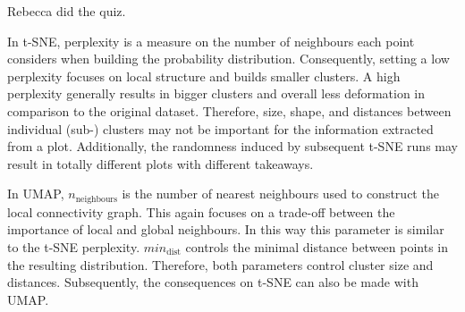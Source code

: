
\renewcommand{\ex}{8}
\setcounter{section}{\ex}


    \maketitle
    
    \begin{exercise}[Quiz] Rebecca did the quiz.
    \end{exercise}

    \begin{exercise}
    In t-SNE, perplexity is a measure on the number of neighbours each point considers when building the probability distribution.
    Consequently, setting a low perplexity focuses on local structure and builds smaller clusters.
    A high perplexity generally results in bigger clusters and overall less deformation in comparison to the original dataset.
    Therefore, size, shape, and distances between individual (sub-) clusters may not be important for the information extracted from a plot.
    Additionally, the randomness induced by subsequent t-SNE runs may result in totally different plots with different takeaways.

    In UMAP, \(n_\text{neighbours}\) is the number of nearest neighbours used to construct the local connectivity graph.
    This again focuses on a trade-off between the importance of local and global neighbours.
    In this way this parameter is similar to the t-SNE perplexity.
    \(min_\text{dist}\) controls the minimal distance between points in the resulting distribution.
    Therefore, both parameters control cluster size and distances.
    Subsequently, the consequences on t-SNE can also be made with UMAP.
    \end{exercise}

